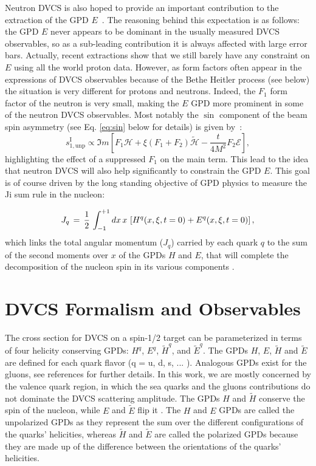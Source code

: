 Neutron DVCS is also hoped to provide an important contribution to the 
extraction of the GPD $E$~\cite{dHose:2016mda}. The reasoning behind this 
expectation is as follows: the GPD $E$ never appears to be dominant in the 
usually measured DVCS observables, so as a sub-leading contribution it is 
always affected with large error bars. Actually, recent extractions 
\cite{Dupre:2017hfs,Moutarde:2018kwr} show that we still barely have any 
constraint on $E$ using all the world proton data. However, as form factors 
often appear in the expressions of DVCS observables because of the Bethe 
Heitler process (see below) the situation is very different for protons and 
neutrons.  Indeed, the $F_1$ form factor of the neutron is very small, making 
the $E$ GPD more prominent in some of the neutron DVCS observables. Most 
notably the $\sin$ component of the beam spin asymmetry (see Eq. \ref{eq:sin} 
below for details) is given by~\cite{dHose:2016mda}:
\begin{equation}
s^\textrm{I}_{1,\textrm{unp}} \propto \Im m \left [ 
F_1 \mathcal{H} + \xi(F_1 + F_2) \mathcal{\tilde H} - \frac{t}{4M^2} F_2  \mathcal{E} \right ],
\end{equation}
highlighting the effect of a suppressed $F_1$ on the main term.
This lead to the idea that neutron DVCS will also help significantly to constrain the 
GPD $E$. This goal is of course driven by the long standing objective of GPD physics to
measure the Ji sum rule in the nucleon:

\begin{equation}
J_q \,=\, {1 \over 2} \, \int_{-1}^{+1} d x \, x \, 
\left[ H^{q}(x,\xi,t = 0) + E^{q}(x,\xi,t = 0) \right],
\label{eq:dvcs_spin}
\end{equation}
which links the total angular momentum ($J_q$) carried by each quark $q$ to the 
sum of the second moments over $x$ of the GPDs $H$ and $E$, that will complete 
the decomposition of the nucleon spin in its various components 
\cite{Ji:1996ek,Leader:2013jra}. 

\section{DVCS Formalism and Observables}

The cross section for DVCS on a spin-1/2 target can be parameterized in terms 
of four helicity conserving GPDs: $H^q$, $E^q$, $\tilde{H}^q$, and 
$\tilde{E}^q$. The GPDs $H$, $E$, $\widetilde{H}$ and $\widetilde{E}$ are 
defined for each quark flavor (q = u, d, s, ... ). Analogous GPDs exist for the 
gluons, see references \cite{PhysRevD.56.5524,Goeke:2001tz} for further 
details.  In this work, we are mostly concerned by the valence quark region, in 
which the sea quarks and the gluons contributions do not dominate the DVCS 
scattering amplitude. The GPDs $H$ and $\widetilde{H}$ conserve the spin of the 
nucleon, while $E$ and $\widetilde{E}$ flip it \cite{Diehl:2001pm}. The $H$ and 
$E$ GPDs are called the unpolarized GPDs as they represent the sum over the 
different configurations of the quarks' helicities, whereas $\widetilde{H}$ and 
$\widetilde{E}$ are called the polarized GPDs because they are made up of the 
difference between the orientations of the quarks' helicities.

